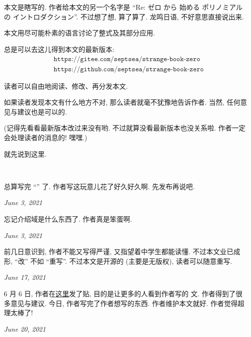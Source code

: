 \section*{\Preface}

本文是瞎写的. 作者给本文的另一个名字是 ``Re: ゼロ から 始める ポリノミアル の イントロダクション''. 不过想了想, 算了算了. 龙鸣日语, 不好意思直接说出来.

本文用尽可能朴素的语言讨论了整式及其部分应用.

总是可以去这儿得到本文的最新版本:
\begin{align*}
     & \texttt{https://gitee.com/septsea/strange-book-zero}  \\
     & \texttt{https://github.com/septsea/strange-book-zero}
\end{align*}

读者可以自由地阅读、修改、再分发本文.

如果读者发现本文有什么地方不对, 那么读者就毫不犹豫地告诉作者. 当然, 任何意见与建议也是可以的.

(记得先看看最新版本改过来没有哟. 不过就算没看最新版本也没关系啦. 作者一定会处理读者的消息的! 嘿嘿.)

就先说到这里.

~\

\providecommand{\appendDate}{}
\renewcommand{\appendDate}[1]{\par \hfill {\itshape \sffamily #1}}

\begin{remark}
    总算写完 ``\Prerequisites'' 了. 作者写这玩意儿花了好久好久啊. 先发布再说吧.
    \appendDate{June 3, 2021}
\end{remark}

\begin{remark}
    忘记介绍域是什么东西了. 作者真是笨蛋啊.
    \appendDate{June 3, 2021}
\end{remark}

\begin{remark}
    前几日意识到, 作者不能又写得严谨, 又指望着中学生都能读懂. 不过本文业已成形, ``改'' 不如 ``重写''. 不过本文是开源的 (主要是无版权), 读者可以随意重写.
    \appendDate{June 17, 2021}
\end{remark}

\begin{remark}
    6 月 6 日, 作者在\hyperref{https://chaoli.club/index.php/6396}{}{}{这里}发了贴, 目的是让更多的人看到作者写的  文. 作者得到了很多意见与建议. 今日, 作者写完了作者想写的东西. 作者维护本文就好. 作者觉得超理太棒了!
    \appendDate{June 20, 2021}
\end{remark}

